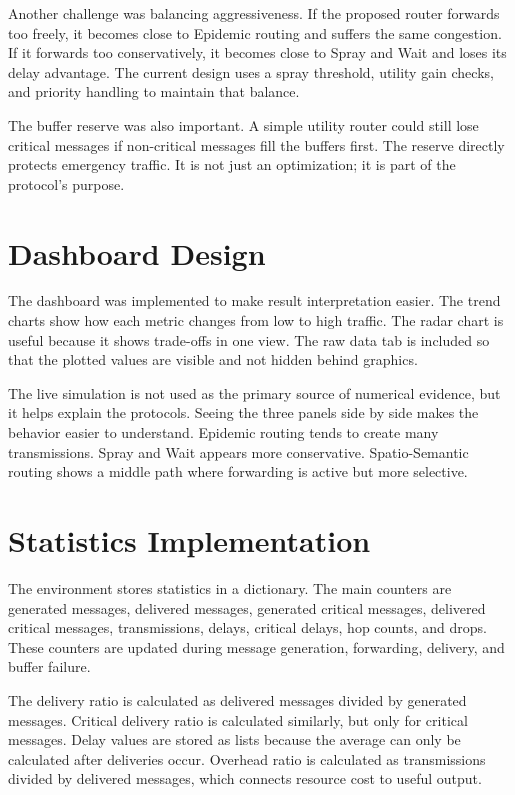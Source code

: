 Another challenge was balancing aggressiveness. If the proposed router forwards too freely, it becomes close to Epidemic routing and suffers the same congestion. If it forwards too conservatively, it becomes close to Spray and Wait and loses its delay advantage. The current design uses a spray threshold, utility gain checks, and priority handling to maintain that balance.

The buffer reserve was also important. A simple utility router could still lose critical messages if non-critical messages fill the buffers first. The reserve directly protects emergency traffic. It is not just an optimization; it is part of the protocol's purpose.

\section{Dashboard Design}
The dashboard was implemented to make result interpretation easier. The trend charts show how each metric changes from low to high traffic. The radar chart is useful because it shows trade-offs in one view. The raw data tab is included so that the plotted values are visible and not hidden behind graphics.

The live simulation is not used as the primary source of numerical evidence, but it helps explain the protocols. Seeing the three panels side by side makes the behavior easier to understand. Epidemic routing tends to create many transmissions. Spray and Wait appears more conservative. Spatio-Semantic routing shows a middle path where forwarding is active but more selective.

\section{Statistics Implementation}
The environment stores statistics in a dictionary. The main counters are generated messages, delivered messages, generated critical messages, delivered critical messages, transmissions, delays, critical delays, hop counts, and drops. These counters are updated during message generation, forwarding, delivery, and buffer failure.

The delivery ratio is calculated as delivered messages divided by generated messages. Critical delivery ratio is calculated similarly, but only for critical messages. Delay values are stored as lists because the average can only be calculated after deliveries occur. Overhead ratio is calculated as transmissions divided by delivered messages, which connects resource cost to useful output.

